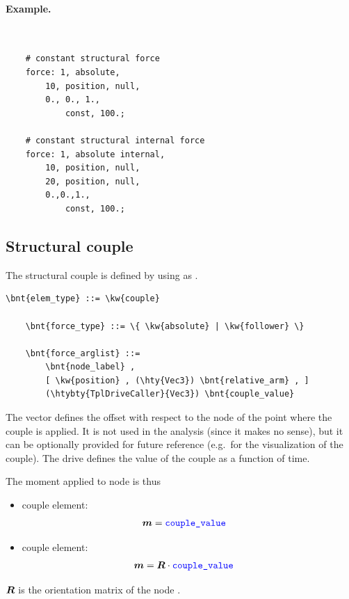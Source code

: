 \paragraph{Example.} \
\begin{verbatim}
    # constant structural force
    force: 1, absolute,
        10, position, null,
        0., 0., 1.,
            const, 100.;

    # constant structural internal force
    force: 1, absolute internal,
        10, position, null,
        20, position, null,
        0.,0.,1.,
            const, 100.;
\end{verbatim}


\subsection{Structural couple}
\label{sec:EL:FORCE:STRUCTURAL:COUPLE}
The structural couple is defined by using  as .
\begin{Verbatim}[commandchars=\\\{\}]
    \bnt{elem_type} ::= \kw{couple}

    \bnt{force_type} ::= \{ \kw{absolute} | \kw{follower} \} 

    \bnt{force_arglist} ::=
        \bnt{node_label} ,
        [ \kw{position} , (\hty{Vec3}) \bnt{relative_arm} , ]
        (\htybty{TplDriveCaller}{Vec3}) \bnt{couple_value}
\end{Verbatim}
The vector  defines the offset with respect
to the node of the point where the couple is applied.
It is not used in the analysis (since it makes no sense),
but it can be optionally provided for future reference
(e.g.\ for the visualization of the couple).
The drive  defines the value of the couple
as a function of time.

The moment applied to node  is thus
\begin{itemize}
\item {} couple element:
\begin{align}
	\boldsymbol{m} & = \textcolor{blue}{\texttt{couple\_value}}
\end{align}

\item {} couple element:
\begin{align}
	\boldsymbol{m} & = \boldsymbol{R} \cdot \textcolor{blue}{\texttt{couple\_value}}
\end{align}
\end{itemize}
$\boldsymbol{R}$ is the orientation matrix of the node .

